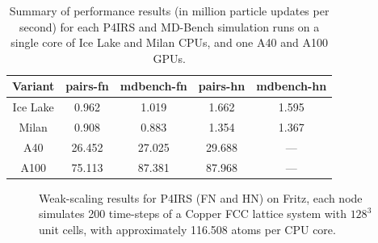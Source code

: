 \documentclass[Afour,sageh,times]{sagej}
\newcommand{\RMchange}[1]{{\setlength{\fboxsep}{0pt}\colorbox{purple!70}{#1}}}
\begin{document}
\begin{table}[htb]
    \centering
    \begin{tabular}{c|c|c|c|c}
        Variant & pairs-fn & mdbench-fn & pairs-hn & mdbench-hn \\
        \hline
        Ice Lake & 0.962 & 1.019 & 1.662 & 1.595 \\
        Milan & 0.908 & 0.883 & 1.354 & 1.367 \\
        A40  & 26.452 & 27.025 & 29.688 & --- \\
        A100 & 75.113 & 87.381 & 87.968 & --- \\
    \end{tabular}
    \caption{\RMchange{Summary of performance results (in million particle updates per second) for each P4IRS and MD-Bench simulation runs on a single core of Ice Lake and Milan CPUs, and one A40 and A100 GPUs.}}
    \label{tab:md_particle_updates_per_second_cpu}
\end{table}

\begin{figure}[t]
\centering
{}
\vspace{-2ex}
\caption{Weak-scaling results for P4IRS (FN and HN) on Fritz, each node simulates 200 time-steps of a Copper FCC lattice system with $128^3$ unit cells, with approximately 116.508 atoms per CPU core.}
\vspace{-2ex}
\label{fig:md_weak_scaling_fritz}
\end{figure}
\end{document}
